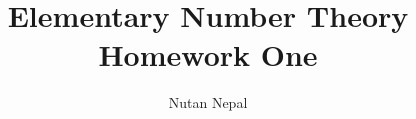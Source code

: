 
\title{Elementary Number Theory\\
        \large Homework One}
\author{Nutan Nepal}

\maketitle
    
    \section{}
    

    \section{}
    

    \section{}
    

    \section{}
    

    \section{}
    
